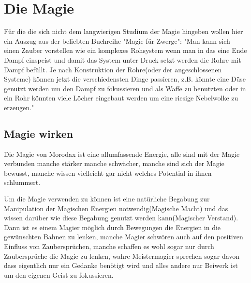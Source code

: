 \chapter{Die Magie}
Für die die sich nicht dem langwierigen Studium der Magie hingeben wollen hier ein Auszug aus der beliebten Buchreihe "Magie für Zwerge": "Man kann sich einen Zauber vorstellen wie ein komplexes Rohsystem wenn man in das eine Ende Dampf einspeist und damit das System unter Druck setzt werden die Rohre mit Dampf befüllt. Je nach Konstruktion der Rohre(oder der angeschlossenen Systeme) können jetzt die verschiedensten Dinge passieren, z.B. könnte eine Düse genutzt werden um den Dampf zu fokussieren und als Waffe zu benutzten oder in ein Rohr könnten viele Löcher eingebaut werden um eine riesige Nebelwolke zu erzeugen."

\section{Magie wirken}
Die Magie von Morodax ist eine allumfassende Energie, alle sind mit der Magie verbunden manche stärker manche schwächer, manche sind sich der Magie bewusst, manche wissen vielleicht gar nicht welches Potential in ihnen schlummert.

Um die Magie verwenden zu können ist eine natürliche Begabung zur Manipulation der Magischen Energien notwendig(Magische Macht) und das wissen darüber wie diese Begabung genutzt werden kann(Magischer Verstand). Dann ist es einem Magier möglich durch Bewegungen die Energien in die gewünschten Bahnen zu lenken, manche Magier schwören auch auf den positiven Einfluss von Zaubersprüchen, manche schaffen es wohl sogar nur durch Zaubersprüche die Magie zu lenken, wahre Meistermagier sprechen sogar davon dass eigentlich nur ein Gedanke benötigt wird und alles andere nur Beiwerk ist um den eigenen Geist zu fokussieren.


